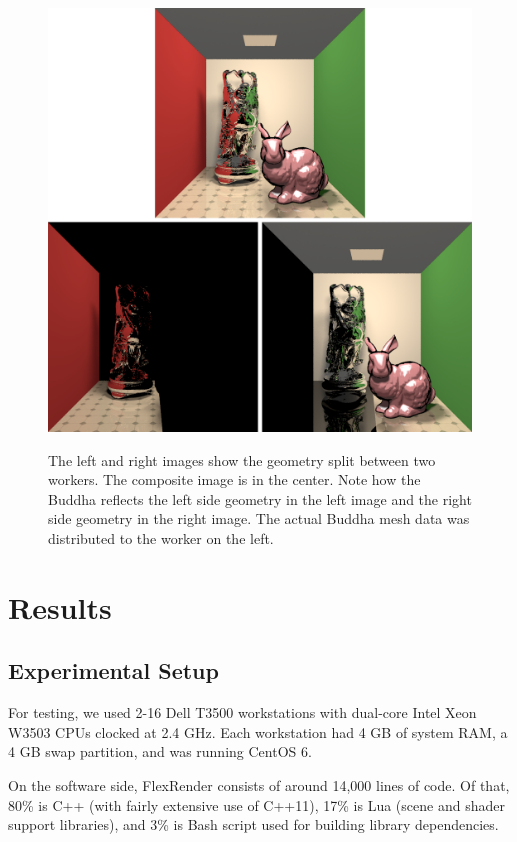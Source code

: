 \documentclass[12pt]{ucthesis}
\newcommand{\captionfonts}{\small\bf\ssp}
\begin{document}
\begin{figure}[h!]
    \centering
    \includegraphics[width=140mm]{images/linearity.png}
    \captionfonts
    \caption{The left and right images show the geometry split between two workers. The composite image is in the center. Note how the Buddha reflects the left side geometry in the left image and the right side geometry in the right image. The actual Buddha mesh data was distributed to the worker on the left.}
    \label{fig:linearity}
\end{figure}

\chapter{Results}
\label{results}

\section{Experimental Setup}
\label{setup}

For testing, we used 2-16 Dell T3500 workstations with dual-core Intel Xeon
W3503 CPUs clocked at 2.4 GHz. Each workstation had 4 GB of system RAM, a 4 GB
swap partition, and was running CentOS 6.

On the software side, FlexRender consists of around 14,000 lines of code. Of
that, 80\% is C++ (with fairly extensive use of C++11), 17\% is Lua (scene and
shader support libraries), and 3\% is Bash script used for building library
dependencies.
\end{document}
